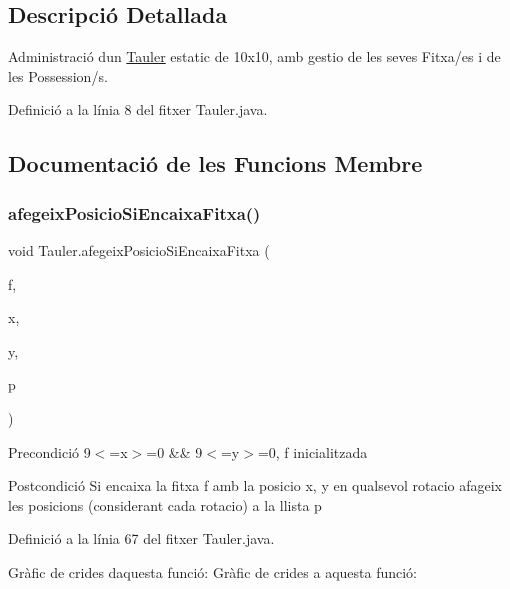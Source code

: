 \subsection{Descripció Detallada}
Administració d\textquotesingle{}un \mbox{\hyperlink{class_tauler}{Tauler}} estatic de 10x10, amb gestio de les seves Fitxa/es i de les Possession/s. 

Definició a la línia 8 del fitxer Tauler.\+java.



\subsection{Documentació de les Funcions Membre}
\mbox{\label{class_tauler_ab373a984846631d85aaab3bee1da1781}} 
\subsubsection{\texorpdfstring{afegeix\+Posicio\+Si\+Encaixa\+Fitxa()}{afegeixPosicioSiEncaixaFitxa()}}
{\footnotesize\ttfamily void Tauler.\+afegeix\+Posicio\+Si\+Encaixa\+Fitxa (\begin{DoxyParamCaption}\item[{\mbox{\hyperlink{class_fitxa}{Fitxa}}}]{f,  }\item[{int}]{x,  }\item[{int}]{y,  }\item[{Array\+List$<$ \mbox{\hyperlink{class_posicio}{Posicio}} $>$}]{p }\end{DoxyParamCaption})\hspace{0.3cm}{\ttfamily [private]}}

\begin{DoxyPrecond}{Precondició}
9$<$=x$>$=0 \&\& 9$<$=y$>$=0, f inicialitzada 
\end{DoxyPrecond}
\begin{DoxyPostcond}{Postcondició}
Si encaixa la fitxa f amb la posicio x, y en qualsevol rotacio afageix les posicions (considerant cada rotacio) a la llista p 
\end{DoxyPostcond}


Definició a la línia 67 del fitxer Tauler.\+java.

Gràfic de crides d\textquotesingle{}aquesta funció\+:
Gràfic de crides a aquesta funció\+:
\mbox{\label{class_tauler_a56f985c8ada16eecb5aca521ced42612}} 
